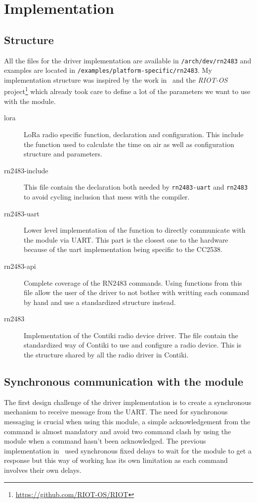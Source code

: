 \section{Implementation}

\subsection{Structure}

All the files for the driver implementation are available in
\lstinline{/arch/dev/rn2483} and examples are located in
\lstinline{/examples/platform-specific/rn2483}.
My implementation structure was inspired by the work in~\cite{8847137} and the
\emph{RIOT-OS} project\footnote{\url{https://github.com/RIOT-OS/RIOT}} which
already took care to define a lot of the parameters we want to use with the
module.

\begin{description}
  \item[lora] LoRa radio specific function, declaration and configuration. This
    include the function used to calculate the time on air as well as
    configuration structure and parameters.
  \item[rn2483-include] This file contain the declaration both needed by
    \lstinline{rn2483-uart} and \lstinline{rn2483} to avoid cycling inclusion
    that mess with the compiler.
  \item[rn2483-uart] Lower level implementation of the function to directly
    communicate with the module via UART\@. This part is the closest one to the
    hardware because of the uart implementation being specific to the CC2538.
  \item[rn2483-api] Complete coverage of the RN2483 commands. Using functions
    from this file allow the user of the driver to not bother with writting
    each command by hand and use a standardized structure instead.
  \item[rn2483] Implementation of the Contiki radio device driver. The file
    contain the standardized way of Contiki to use and configure a radio device.
    This is the structure shared by all the radio driver in Contiki.
\end{description}

\subsection{Synchronous communication with the module}

The first design challenge of the driver implementation is to create a
synchronous mechanism to receive message from the UART\@. 
The need for synchronous messaging is crucial when using this module, a simple
acknowledgement from the command is almost mandatory and avoid two command
clash by using the module when a command hasn't been acknowledged.
The previous implementation in~\cite{8847137} used synchronous fixed delays to 
wait for the module to get a response but this way of working has its own limitation 
as each command involves their own delays.

